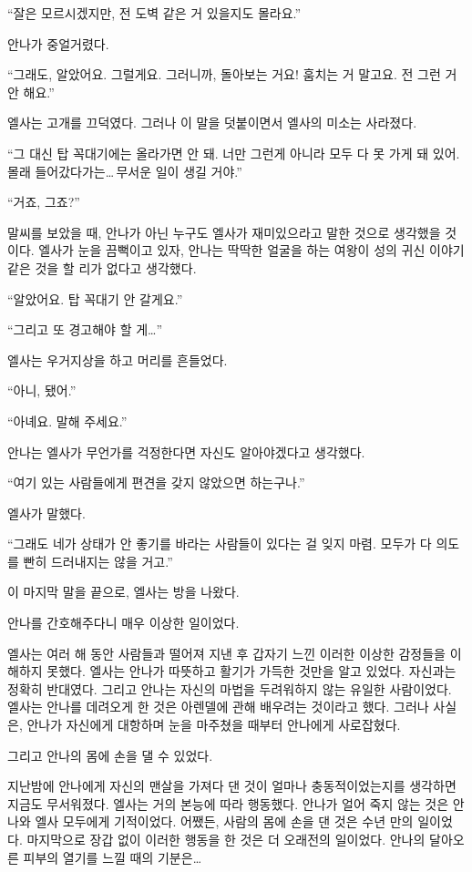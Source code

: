 ``잘은 모르시겠지만, 전 도벽 같은 거 있을지도 몰라요.''

안나가 중얼거렸다.

``그래도, 알았어요. 그럴게요. 그러니까, 돌아보는 거요! 훔치는 거 말고요. 전 그런 거 안 해요.''

엘사는 고개를 끄덕였다. 그러나 이 말을 덧붙이면서 엘사의 미소는 사라졌다.

``그 대신 탑 꼭대기에는 올라가면 안 돼. 너만 그런게 아니라 모두 다 못 가게 돼 있어. 몰래 들어갔다가는\ldots\,무서운 일이 생길 거야.''

`` 거죠, 그죠?''

말씨를 보았을 때, 안나가 아닌 누구도 엘사가 재미있으라고 말한 것으로 생각했을 것이다. 엘사가 눈을 끔뻑이고 있자, 안나는 딱딱한 얼굴을 하는 여왕이 성의 귀신 이야기 같은 것을 할 리가 없다고 생각했다.

``알았어요. 탑 꼭대기 안 갈게요.''

``그리고 또 경고해야 할 게\ldots''

엘사는 우거지상을 하고 머리를 흔들었다.

``아니, 됐어.''

``아녜요. 말해 주세요.''

안나는 엘사가 무언가를 걱정한다면 자신도 알아야겠다고 생각했다.

``여기 있는 사람들에게 편견을 갖지 않았으면 하는구나.''

엘사가 말했다.

``그래도 네가 상태가 안 좋기를 바라는 사람들이 있다는 걸 잊지 마렴. 모두가 다 의도를 빤히 드러내지는 않을 거고.''

이 마지막 말을 끝으로, 엘사는 방을 나왔다.

\textbreak

안나를 간호해주다니 매우 이상한 일이었다.

엘사는 여러 해 동안 사람들과 떨어져 지낸 후 갑자기 느낀 이러한 이상한 감정들을 이해하지 못했다. 엘사는 안나가 따뜻하고 활기가 가득한 것만을 알고 있었다. 자신과는 정확히 반대였다. 그리고 안나는 자신의 마법을 두려워하지 않는 유일한 사람이었다. 엘사는 안나를 데려오게 한 것은 아렌델에 관해 배우려는 것이라고 했다. 그러나 사실은, 안나가 자신에게 대항하며 눈을 마주쳤을 때부터 안나에게 사로잡혔다.

그리고 안나의 몸에 손을 댈 수 있었다.

지난밤에 안나에게 자신의 맨살을 가져다 댄 것이 얼마나 충동적이었는지를 생각하면 지금도 무서워졌다. 엘사는 거의 본능에 따라 행동했다. 안나가 얼어 죽지 않는 것은 안나와 엘사 모두에게 기적이었다. 어쨌든, 사람의 몸에 손을 댄 것은 수년 만의 일이었다. 마지막으로 장갑 없이 이러한 행동을 한 것은 더 오래전의 일이었다. 안나의 달아오른 피부의 열기를 느낄 때의 기분은\ldots

